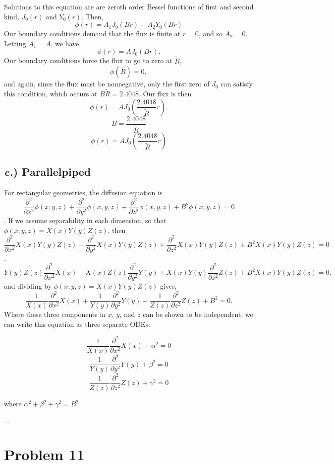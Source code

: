 \documentclass{article}
\newcommand{\p}{\partial}
\begin{document}
Solutions to this equation are are zeroth order Bessel functions of first and second kind, $J_0(r)$ and $Y_0(r)$. 
Then,
$$ \phi(r) = A_1 J_0(B r) + A_2 Y_0(B r) $$
Our boundary conditions demand that the flux is finite at $r = 0$, and so $A_2 = 0$. 
Letting $A_1 = A$, we have
$$ \phi(r) = A J_0(B r) .$$
Our boundary conditions force the flux to go to zero at $\tilde{R}$,
$$ \phi(\tilde{R}) = 0 ,$$
and again, since the flux must be nonnegative, only the first zero of $J_0$ can satisfy this condition, which occurs at $B \tilde{R} = 2.4048$.
Our flux is then
$$ \phi(r) = A J_0(\frac{2.4048}{\tilde{R}} r) .$$
$$\boxed{ B = \frac{2.4048}{\tilde{R}} }$$
$$\boxed{ \phi(r) = A J_0(\frac{2.4048}{\tilde{R}} r) }$$

\subsection*{\textit{c.}) Parallelpiped}

For rectangular geometries, the diffusion equation is
$$ \frac{\p^2}{\p x^2}\phi(x,y,z) + \frac{\p^2}{\p y^2}\phi(x,y,z) + \frac{\p^2}{\p z^2}\phi(x,y,z) + B^2\phi(x,y,z) = 0 $$.
If we assume separability in each dimension, so that $\phi(x,y,z) = X(x)Y(y)Z(z)$, then
$$ \frac{\p^2}{\p x^2}X(x)Y(y)Z(z) + \frac{\p^2}{\p y^2}X(x)Y(y)Z(z) + \frac{\p^2}{\p z^2}X(x)Y(y)Z(z) + B^2X(x)Y(y)Z(z) = 0 $$.
$$ Y(y)Z(z)\frac{\p^2}{\p x^2}X(x) + X(x)Z(z)\frac{\p^2}{\p y^2}Y(y) + X(x)Y(y)\frac{\p^2}{\p z^2}Z(z) + B^2X(x)Y(y)Z(z) = 0 .$$
and dividing by $\phi(x,y,z) = X(x)Y(y)Z(z)$ gives,
$$ \frac{1}{X(x)}\frac{\p^2}{\p x^2}X(x) + \frac{1}{Y(y)}\frac{\p^2}{\p y^2}Y(y) + \frac{1}{Z(z)}\frac{\p^2}{\p z^2}Z(z) + B^2 = 0 .$$
Where these three components in $x$, $y$, and $z$ can be shown to be independent, we can write this equation as three separate ODEs:

\begin{multicols}{3}
$$ \frac{1}{X(x)}\frac{\p^2}{\p x^2}X(x) + \alpha^2 = 0 $$
$$ \frac{1}{Y(y)}\frac{\p^2}{\p y^2}Y(y) + \beta^2 = 0 $$
$$ \frac{1}{Z(z)}\frac{\p^2}{\p z^2}Z(z) + \gamma^2 = 0 $$
\end{multicols}
where $\alpha^2 + \beta^2 + \gamma^2 = B^2$

...



\section*{Problem 11}
\end{document}
